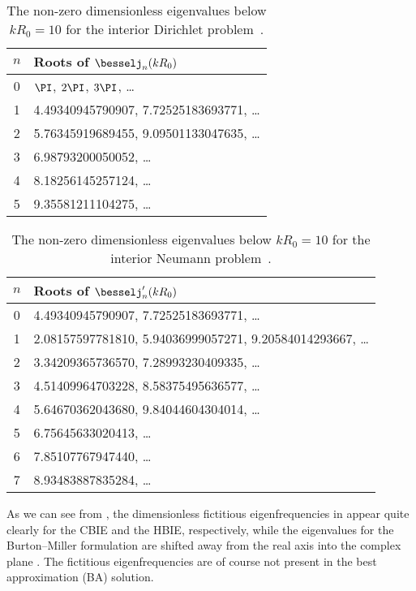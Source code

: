 \begin{table}
	\centering
	\caption{The non-zero dimensionless eigenvalues below $kR_0=10$ for the interior Dirichlet problem~\cite{Zheng2015itb}.}
	\label{Tab3:eigenFreqDirichlet}
	\begin{tabular}{c l}
		\toprule
		$n$ & Roots of $\besselj_n(kR_0)$ \\
		\hline
		0 & $\PI$, $2\PI$, $3\PI$, \dots \\
	    1 & 4.49340945790907, 7.72525183693771, \dots \\
	  	2 & 5.76345919689455, 9.09501133047635, \dots \\
	    3 & 6.98793200050052, \dots \\
	    4 & 8.18256145257124, \dots \\
	    5 & 9.35581211104275, \dots \\
		\bottomrule
	\end{tabular}
\end{table}
\begin{table}
	\centering
	\caption{The non-zero dimensionless eigenvalues below $kR_0=10$ for the interior Neumann problem~\cite{Zheng2015itb}.}
	\label{Tab3:eigenFreqNeumann}
	\begin{tabular}{c l}
		\toprule
		$n$ & Roots of $\besselj_n'(kR_0)$\\
		\hline
		0 & 4.49340945790907, 7.72525183693771, \dots \\
	    1 & 2.08157597781810, 5.94036999057271, 9.20584014293667, \dots \\
	  	2 & 3.34209365736570, 7.28993230409335, \dots \\
	    3 & 4.51409964703228, 8.58375495636577, \dots \\
	    4 & 5.64670362043680, 9.84044604304014, \dots \\
	    5 & 6.75645633020413, \dots \\
	    6 & 7.85107767947440, \dots \\
	    7 & 8.93483887835284, \dots \\
		\bottomrule
	\end{tabular}
\end{table}

As we can see from , the dimensionless fictitious eigenfrequencies in  appear quite clearly for the CBIE and the HBIE, respectively, while the eigenvalues for the Burton--Miller formulation are shifted away from the real axis into the complex plane \cite{Zheng2015itb}. The fictitious eigenfrequencies are of course not present in the best approximation (BA) solution.

